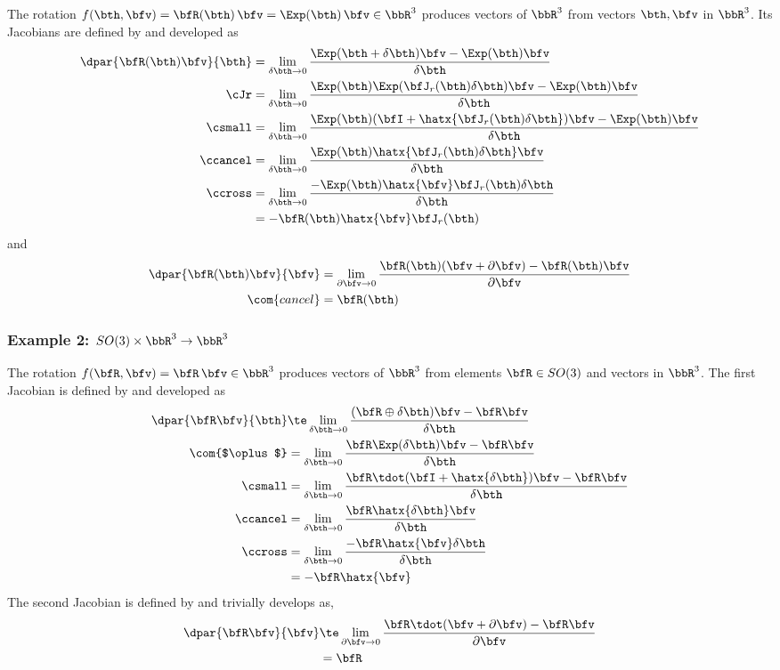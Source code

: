 The rotation $f(\bth,\bfv) = \bfR(\bth)\,\bfv = \Exp(\bth)\,\bfv \in \bbR^3$ produces vectors of $\bbR^3$ from vectors $\bth,\bfv$ in $\bbR^3$. Its Jacobians are defined by  and developed as
%
\begin{align*}
\dpar{\bfR(\bth)\bfv}{\bth} 
&= \lim_{\delta\bth\to0}\frac{\Exp(\bth+\delta\bth)\bfv-\Exp(\bth)\bfv}{\delta\bth} \\
\cJr
&= \lim_{\delta\bth\to0}\frac{\Exp(\bth)\Exp(\bfJ_r(\bth)\delta\bth)\bfv-\Exp(\bth)\bfv}{\delta\bth} \\
\csmall
&= \lim_{\delta\bth\to0}\frac{\Exp(\bth)(\bfI+\hatx{\bfJ_r(\bth)\delta\bth})\bfv-\Exp(\bth)\bfv}{\delta\bth} \\
\ccancel
&= \lim_{\delta\bth\to0}\frac{\Exp(\bth)\hatx{\bfJ_r(\bth)\delta\bth}\bfv}{\delta\bth} \\
\ccross
&= \lim_{\delta\bth\to0}\frac{-\Exp(\bth)\hatx{\bfv}\bfJ_r(\bth)\delta\bth}{\delta\bth} \\
&= -\bfR(\bth)\hatx{\bfv}\bfJ_r(\bth) 
\end{align*}
%
and
%
\begin{align*}
\dpar{\bfR(\bth)\bfv}{\bfv} 
&= \lim_{\partial\bfv\to0}\frac{\bfR(\bth)(\bfv+\partial\bfv)-\bfR(\bth)\bfv}{\partial\bfv} \\
\com{cancel} 
&= \bfR(\bth)
\end{align*}

\subsubsection{Example 2: $SO(3)\times\bbR^3\to\bbR^3$} 

The rotation $f(\bfR,\bfv) = \bfR\,\bfv \in \bbR^3$ produces vectors of $\bbR^3$ from elements $\bfR\in SO(3)$ and vectors in $\bbR^3$. The first Jacobian is defined by  and developed as
%
\begin{align*}
\dpar{\bfR\bfv}{\bth} 
&\te \lim_{\delta\bth\to0}\frac{(\bfR\oplus\delta\bth)\bfv-\bfR\bfv}{\delta\bth} \\
\com{$\oplus$}
&= \lim_{\delta\bth\to0}\frac{\bfR\Exp(\delta\bth)\bfv-\bfR\bfv}{\delta\bth} \\
\csmall
&= \lim_{\delta\bth\to0}\frac{\bfR\tdot(\bfI+\hatx{\delta\bth})\bfv-\bfR\bfv}{\delta\bth} \\
\ccancel
&= \lim_{\delta\bth\to0}\frac{\bfR\hatx{\delta\bth}\bfv}{\delta\bth} \\
\ccross
&= \lim_{\delta\bth\to0}\frac{-\bfR\hatx{\bfv}\delta\bth}{\delta\bth} \\
&= -\bfR\hatx{\bfv} 
\end{align*}
%
The second Jacobian is defined by  and trivially develops as,
%
\begin{align*}
\dpar{\bfR\bfv}{\bfv} 
&\te \lim_{\partial\bfv\to0}\frac{\bfR\tdot(\bfv+\partial\bfv)-\bfR\bfv}{\partial\bfv} \\
&= \bfR
\end{align*}

